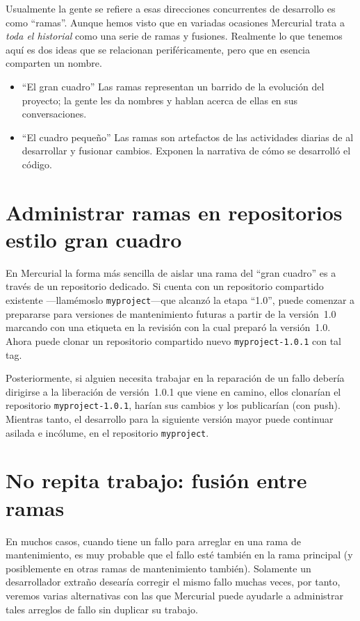 Usualmente la gente se refiere a esas direcciones
concurrentes de desarrollo es como ``ramas''.  Aunque hemos visto que
en variadas ocasiones Mercurial trata a \emph{toda el historial} como
una serie de ramas y fusiones.  Realmente lo que tenemos aquí es dos
ideas que se relacionan periféricamente, pero que en esencia comparten
un nombre.
\begin{itemize}
\item ``El gran cuadro'' Las ramas representan un barrido de la
  evolución del proyecto; la gente les da nombres y hablan acerca de
  ellas en sus conversaciones.
\item ``El cuadro pequeño'' Las ramas son artefactos de las
  actividades diarias de al desarrollar y fusionar cambios. Exponen la
  narrativa de cómo se desarrolló el código.
\end{itemize}

\section{Administrar ramas en repositorios estilo gran cuadro}

En Mercurial la forma más sencilla de aislar una rama del ``gran
cuadro'' es a través de un repositorio dedicado.  Si cuenta con un
repositorio compartido existente ---llamémoslo
\texttt{myproject}---que alcanzó la etapa ``1.0'', puede comenzar a
prepararse para versiones de mantenimiento futuras a partir de la
versión~1.0 marcando con una etiqueta en la revisión con la cual preparó la versión~1.0.
Ahora puede clonar un repositorio compartido nuevo
\texttt{myproject-1.0.1} con tal tag.

Posteriormente, si alguien necesita trabajar en la reparación de un
fallo debería dirigirse a la liberación de versión~1.0.1 que viene en
camino, ellos clonarían el repositorio \texttt{myproject-1.0.1},
harían sus cambios y los publicarían (con push).
Mientras tanto, el desarrollo para la siguiente versión mayor puede
continuar asilada e incólume, en el repositorio \texttt{myproject}.

\section{No repita trabajo: fusión entre ramas}

En muchos casos, cuando tiene un fallo para arreglar en una rama de
mantenimiento, es muy probable que el fallo esté también en la rama
principal (y posiblemente en otras ramas de mantenimiento
también). Solamente un desarrollador extraño desearía corregir el
mismo fallo muchas veces, por tanto, veremos varias alternativas con
las que Mercurial puede ayudarle a administrar tales arreglos de fallo
sin duplicar su trabajo.

